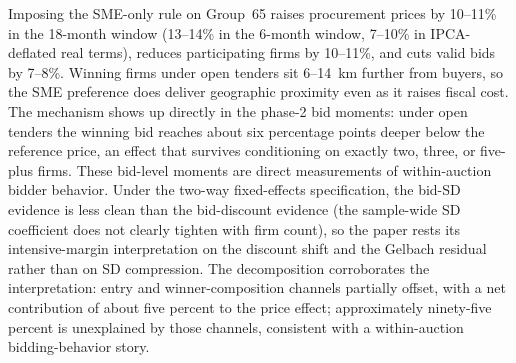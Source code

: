 Imposing the SME-only rule on Group~65 raises procurement prices by 10--11\% in the 18-month window (13--14\% in the 6-month window, 7--10\% in IPCA-deflated real terms), reduces participating firms by 10--11\%, and cuts valid bids by 7--8\%. Winning firms under open tenders sit 6--14~km further from buyers, so the SME preference does deliver geographic proximity even as it raises fiscal cost. The mechanism shows up directly in the phase-2 bid moments: under open tenders the winning bid reaches about six percentage points deeper below the reference price, an effect that survives conditioning on exactly two, three, or five-plus firms. These bid-level moments are direct measurements of within-auction bidder behavior. Under the two-way fixed-effects specification, the bid-SD evidence is less clean than the bid-discount evidence (the sample-wide SD coefficient does not clearly tighten with firm count), so the paper rests its intensive-margin interpretation on the discount shift and the Gelbach residual rather than on SD compression. The \citet{gelbach2016} decomposition corroborates the interpretation: entry and winner-composition channels partially offset, with a net contribution of about five percent to the price effect; approximately ninety-five percent is unexplained by those channels, consistent with a within-auction bidding-behavior story.

